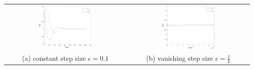 \documentclass[a4 paper, 12pt]{article}
\begin{document}
\begin{center}
        \begin{tabular}{c c}
                \includegraphics[width=0.45\textwidth]{E210_cons_state.pdf} & \includegraphics[width=0.45\textwidth]{E210_van_state.pdf} \\
                (a) constant step size $\epsilon=0.1$ & (b) vanishing step size $\epsilon = \frac{1}{k}$
        \end{tabular}
\end{center}




% 


            
\end{document}
